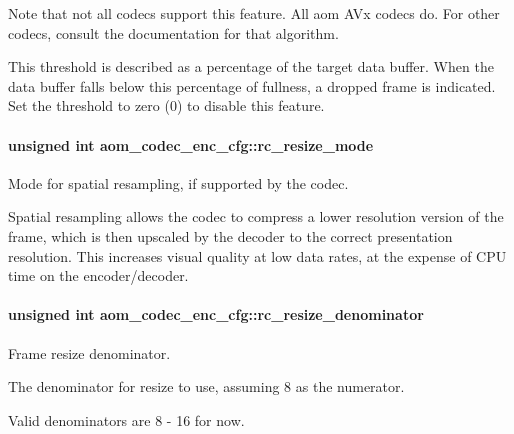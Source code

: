 Note that not all codecs support this feature. All aom A\+Vx codecs do. For other codecs, consult the documentation for that algorithm.

This threshold is described as a percentage of the target data buffer. When the data buffer falls below this percentage of fullness, a dropped frame is indicated. Set the threshold to zero (0) to disable this feature. 
\paragraph[{\texorpdfstring{rc\+\_\+resize\+\_\+mode}{rc_resize_mode}}]{\setlength{\rightskip}{0pt plus 5cm}unsigned int aom\+\_\+codec\+\_\+enc\+\_\+cfg\+::rc\+\_\+resize\+\_\+mode}\hypertarget{structaom__codec__enc__cfg_ab9123d944cd168511d65c823b30d5705}{}\label{structaom__codec__enc__cfg_ab9123d944cd168511d65c823b30d5705}


Mode for spatial resampling, if supported by the codec. 

Spatial resampling allows the codec to compress a lower resolution version of the frame, which is then upscaled by the decoder to the correct presentation resolution. This increases visual quality at low data rates, at the expense of C\+PU time on the encoder/decoder. 
\paragraph[{\texorpdfstring{rc\+\_\+resize\+\_\+denominator}{rc_resize_denominator}}]{\setlength{\rightskip}{0pt plus 5cm}unsigned int aom\+\_\+codec\+\_\+enc\+\_\+cfg\+::rc\+\_\+resize\+\_\+denominator}\hypertarget{structaom__codec__enc__cfg_a0e1d616495fb994ed67418b90b14f168}{}\label{structaom__codec__enc__cfg_a0e1d616495fb994ed67418b90b14f168}


Frame resize denominator. 

The denominator for resize to use, assuming 8 as the numerator.

Valid denominators are 8 -\/ 16 for now. 
